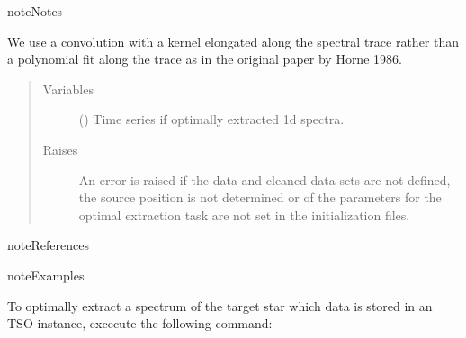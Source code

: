 \documentclass[a4paper,10pt,english]{sphinxmanual}
\begin{document}
\begin{fulllineitems}
\begin{fulllineitems}
\begin{sphinxadmonition}{note}{Notes}

We use a convolution with a kernel elongated along the spectral trace
rather than a polynomial fit along the trace as in the original paper
by Horne 1986.
\end{sphinxadmonition}
\begin{quote}\begin{description}
\item[{Variables}] \leavevmode
{} () \textendash{} Time series if optimally extracted 1d spectra.

\item[{Raises}] \leavevmode
{} \textendash{} An error is raised if the data and cleaned data sets are not
defined, the source position is not determined or of the
parameters for the optimal extraction task are not set in the
initialization files.

\end{description}\end{quote}

\begin{sphinxadmonition}{note}{References}
\end{sphinxadmonition}

\begin{sphinxadmonition}{note}{Examples}

To optimally extract a spectrum of the target star which data is stored
in an TSO instance, excecute the following command:

%
\begin{sphinxVerbatim}[commandchars=\\\{\}]
\end{sphinxVerbatim}
\end{sphinxadmonition}

\end{fulllineitems}



\end{fulllineitems}
\end{document}
